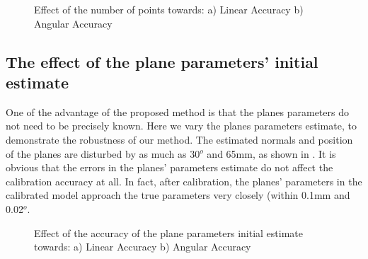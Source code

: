 \begin{figure}[h]
  \centering
  \;
  \caption{Effect of the number of points towards: a) Linear Accuracy b) Angular Accuracy} 
  \label{fig:num_of_points}
\end{figure}


\subsection{The effect of the plane parameters' initial estimate}
\label{sec:plane_params}
One of the advantage of the proposed method is that the planes parameters do not need to be precisely known. Here we vary the planes parameters estimate, to demonstrate the robustness of our method. The estimated normals and position of the planes are disturbed by as much as 30$^o$ and 65mm, as shown in . It is obvious that the errors in the planes' parameters estimate do not affect the calibration accuracy at all. In fact, after calibration, the planes' parameters in the calibrated model approach the true parameters very closely (within 0.1mm and 0.02$^o$.


\begin{figure}[h]
  \centering
  \;
  \caption{Effect of the accuracy of the plane parameters initial estimate towards: a) Linear Accuracy b) Angular Accuracy} 
  \label{fig:plane_params}
\end{figure}



